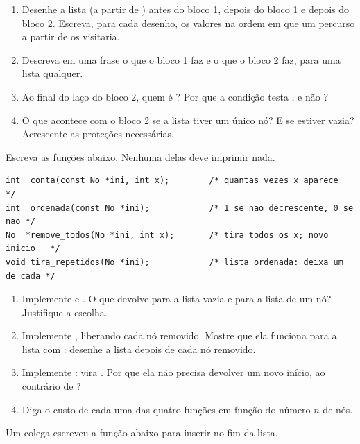 \documentclass[11pt,a4paper]{article}
\begin{document}
\begin{enumerate}[label=(\alph*),leftmargin=1.8em,itemsep=1pt]
  \item Desenhe a lista (a partir de ) antes do bloco 1, depois do bloco 1 e
        depois do bloco 2. Escreva, para cada desenho, os valores na ordem em que
        um percurso a partir de  os visitaria.
  \item Descreva em uma frase o que o bloco 1 faz e o que o bloco 2 faz, para uma
        lista qualquer.
  \item Ao final do laço do bloco 2, quem é ? Por que a condição testa
        , e não ?
  \item O que acontece com o bloco 2 se a lista tiver um único nó? E se estiver
        vazia? Acrescente as proteções necessárias.
\end{enumerate}

Escreva as funções abaixo. Nenhuma delas deve imprimir nada.

\begin{lstlisting}
int  conta(const No *ini, int x);        /* quantas vezes x aparece        */
int  ordenada(const No *ini);            /* 1 se nao decrescente, 0 se nao */
No  *remove_todos(No *ini, int x);       /* tira todos os x; novo inicio   */
void tira_repetidos(No *ini);            /* lista ordenada: deixa um de cada */
\end{lstlisting}

\begin{enumerate}[label=(\alph*),leftmargin=1.8em,itemsep=1pt]
  \item Implemente  e . O que  devolve para a
        lista vazia e para a lista de um nó? Justifique a escolha.
  \item Implemente , liberando cada nó removido. Mostre que ela
        funciona para a lista  com :
        desenhe a lista depois de cada nó removido.
  \item Implemente : 
        vira . Por que ela não precisa devolver um novo
        início, ao contrário de ?
  \item Diga o custo de cada uma das quatro funções em função do número $n$ de nós.
\end{enumerate}

Um colega escreveu a função abaixo para inserir  no fim da lista.
\end{document}
